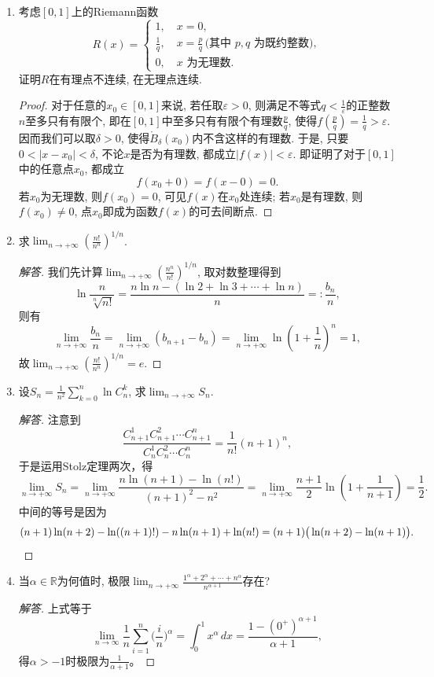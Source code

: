 \begin{2a}
\begin{enumerate}
\begin{proof}
\end{proof}
\item 考虑\([0,1]\)上的Riemann函数\[R(x)=\begin{cases}
    1,\quad x=0,\\
    \frac{1}{q},\quad x=\frac{p}{q}\,\text{(其中 \(p,q\) 为既约整数)},\\
    0,\quad x\text{ 为无理数}.
\end{cases}\]证明\(R\)在有理点不连续, 在无理点连续.
\begin{proof}
对于任意的\(x_0\in[0,1]\)来说, 若任取\(\varepsilon>0\), 则满足不等式\(q<\frac{1}{\varepsilon}\)的正整数\(n\)至多只有有限个, 即在\([0,1]\)中至多只有有限个有理数\(\frac{p}{q}\), 使得\(f\left(\frac{p}{q}\right)=\frac{1}{q}>\varepsilon\). 因而我们可以取\(\delta>0\), 使得\(\mathring{B}_\delta(x_0)\)内不含这样的有理数. 于是, 只要\(0<|x-x_0|<\delta\), 不论\(x\)是否为有理数, 都成立\(|f(x)|<\varepsilon\). 即证明了对于\([0,1]\)中的任意点\(x_0\), 都成立\[f(x_0+0)=f(x-0)=0.\]
若\(x_0\)为无理数, 则\(f(x_0)=0\), 可见\(f(x)\)在\(x_0\)处连续; 
若\(x_0\)是有理数, 则\(f(x_0)\ne 0\), 点\(x_0\)即成为函数\(f(x)\)的可去间断点.
\end{proof}
\item 求\(\lim_{n\rightarrow+\infty}\left(\frac{n!}{n^n}\right)^{1/n}\).
\begin{proof}[解答]
我们先计算\(\lim_{n\rightarrow+\infty}\left(\frac{n^n}{n!}\right)^{1/n}\), 取对数整理得到
\[\ln\frac{n}{\sqrt[n]{n!}}=\frac{n\ln n-\left(\ln 2+\ln 3+\cdots+\ln n\right)}{n}=:\frac{b_n}{n},\]
则有\[\lim_{n\rightarrow+\infty}\frac{b_n}{n}=\lim_{n\rightarrow+\infty}\left(b_{n+1}-b_n\right)=\lim_{n\rightarrow+\infty}\ln\left(1+\frac{1}{n}\right)^n=1,\]
故\(\lim_{n\rightarrow+\infty}\left(\frac{n!}{n^n}\right)^{1/n}=e\).
\end{proof}
\item 设\(S_n=\frac{1}{n^2}\sum_{k=0}^{n}\ln C_n^k\), 求\(\lim_{n\rightarrow+\infty}S_n.\)
\begin{proof}[解答]
注意到\[\frac{C_{n+1}^1C_{n+1}^2\cdots C_{n+1}^n}{C_n^1C_n^2\cdots C_n^n}=\frac{1}{n!}(n+1)^n,\]
于是运用Stolz定理两次，得
\[\lim_{n\rightarrow+\infty }S_n
=\lim_{n\rightarrow+\infty}\frac{n\ln(n+1)-\ln(n!)}{(n+1)^2-n^2}
=\lim_{n\rightarrow+\infty}\frac{n+1}{2}\ln\left(1+\frac{1}{n+1}\right)
=\frac{1}{2}.\]
中间的等号是因为
\[(n+1)\ln(n+2)-\ln((n+1)!)-n\ln(n+1)+\ln(n!)=(n+1)\big(\ln(n+2)-\ln(n+1)\big).\qedhere\]
\end{proof}
\item 当\(\alpha\in\mathbb{R}\)为何值时, 极限\(\lim_{n\rightarrow+\infty}\frac{1^\alpha+2^\alpha+\cdots+n^\alpha}{n^{\alpha+1}}\)存在?
\begin{proof}[解答]
上式等于\[\lim_{n\to\infty}\frac{1}{n}\sum_{i=1}^n\Big(\frac{i}{n}\Big)^\alpha
=\int_0^1 x^\alpha\,dx=\frac{1-(0^+)^{\alpha+1}}{\alpha+1},\]
得$\alpha>-1$时极限为\(\frac{1}{\alpha+1}\)。


\end{proof}
\end{enumerate}
\end{2a}
